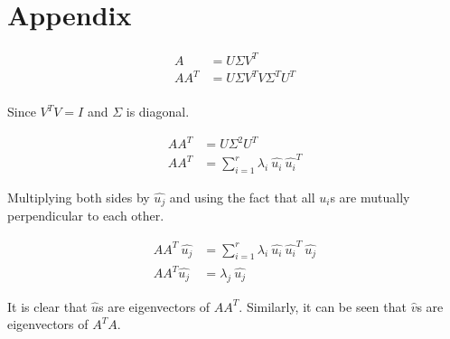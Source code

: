 \documentclass[11pt, a4paper]{article}
\begin{document}
\section{Appendix} 
 
\begin{align*}
	A    & = U\Sigma V^T                \\
	AA^T & = U\Sigma V^T V \Sigma^T U^T \\
\end{align*} 
 
Since $V^TV = I$ and $\Sigma$ is diagonal.

\begin{align*}
	AA^T & = U \Sigma^2 U^T                                   \\
	AA^T & = \sum_{i = 1}^r \lambda_i\ \hat{u_i}\ \hat{u_i}^T 
\end{align*}

Multiplying both sides by $\hat{u_j}$ and using the fact that all $u_i$s
are mutually perpendicular to each other.

\begin{align*}
	AA^T\ \hat{u_j} & = \sum_{i = 1}^r \lambda_i\ \hat{u_i}\ \hat{u_i}^T \ \hat{u_j} \\
	AA^T \hat{u_j}  & = \lambda_j\ \hat{u_j}                                         
\end{align*}

It is clear that $\hat{u}$s are eigenvectors of $AA^T$. Similarly, it can be seen that $\hat{v}$s are eigenvectors of $A^TA$. 
\end{document}
